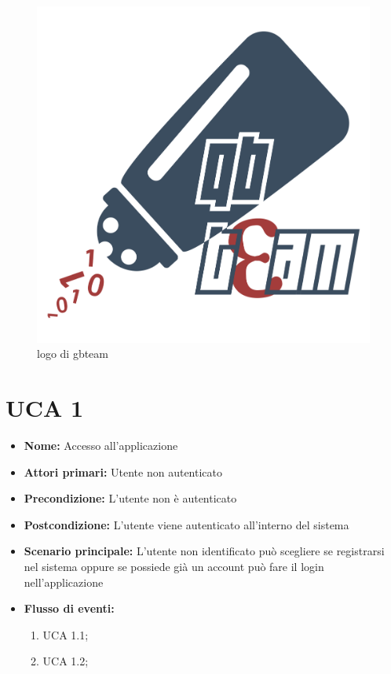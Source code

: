 \documentclass[a4paper, oneside, dvipsnames, table]{article} %
\begin{document}

\begin{figure}[h]
\centering\includegraphics[scale=0.1]{qbteam.png}%
\caption{logo di gbteam}
\label{logo}
\end{figure}

\section{UCA  1}%
\begin{itemize}
\item \textbf{Nome:} Accesso all'applicazione
\item \textbf{Attori primari:} Utente non autenticato
\item \textbf{Precondizione:} L’utente non è autenticato
\item \textbf{Postcondizione:} L’utente viene autenticato all’interno del sistema 
\item \textbf{Scenario principale:} L'utente non identificato può scegliere se registrarsi nel sistema oppure se possiede già un account può fare il login nell'applicazione %
\item \textbf{Flusso di eventi:}
    \begin{enumerate}
        \item UCA 1.1;
        \item UCA 1.2;
    \end{enumerate}

\end{itemize}
\end{document}
